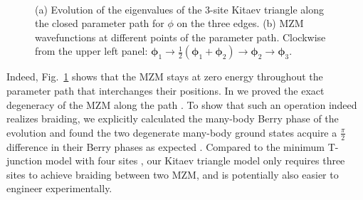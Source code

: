 \documentclass[aps,prb,twocolumn,showpacs,amsmath,amssymb,superscriptaddress]{revtex4-2}
\begin{document}
\begin{figure}[ht]
	\centering
  \hspace{-18pt}
  \\
	\caption{(a) Evolution of the eigenvalues of the 3-site Kitaev triangle along the closed parameter path for $\phi$ on the three edges. (b) MZM wavefunctions at different points of the parameter path. Clockwise from the upper left panel: $\bm \phi_1 \rightarrow \frac{1}{2}(\bm \phi_1 + \bm \phi_2)\rightarrow \bm \phi_2\rightarrow \bm \phi_3$.}
	\label{fig:3eig}
\end{figure}

Indeed, Fig.~\ref{fig:3eig} shows that the MZM stays at zero energy throughout the parameter path that interchanges their positions. In \cite{supp} we proved the exact degeneracy of the MZM along the path \cite{FU_2021}. To show that such an operation indeed realizes braiding, we explicitly calculated the many-body Berry phase of the evolution \cite{supp,aliceaNonAbelianStatisticsTopological2011,liManipulatingMajoranaZero2016} and found the two degenerate many-body ground states acquire a $\frac{\pi}{2}$ difference in their Berry phases as expected \cite{aliceaNonAbelianStatisticsTopological2011}. Compared to the minimum T-junction model with four sites \cite{aliceaNonAbelianStatisticsTopological2011,Pandey_2023}, our Kitaev triangle model only requires three sites to achieve braiding between two MZM, and is potentially also easier to engineer experimentally.
\end{document}

